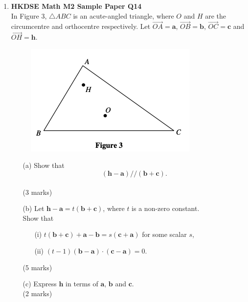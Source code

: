 \documentclass{report}
\begin{document}
\begin{enumerate}
	\item \textbf{HKDSE Math M2 Sample Paper Q14}\\
	In Figure 3, $\triangle ABC$ is an acute-angled triangle, where $O$ and $H$ are the circumcentre and orthocentre respectively. Let $\overrightarrow{OA} = \textbf{a}$, $\overrightarrow{OB} = \textbf{b}$, $\overrightarrow{OC} = \textbf{c}$ and $\overrightarrow{OH} = \textbf{h}$.
	\begin{figure}[H]
		\centering
		\includegraphics[width = .4\linewidth]{SPFigure3}
	\end{figure}
	\begin{enumerate}
		\item [(a)]Show that $$(\textbf{h} - \textbf{a})//(\textbf{b}+\textbf{c}).$$ \\(3 marks)
		\item [(b)]Let $\textbf{h} - \textbf{a} = t(\textbf{b}+\textbf{c})$, where $t$ is a non-zero constant.\\
		Show that 
		\begin{enumerate}
			\item [(i)]$t(\textbf{b}+\textbf{c}) + \textbf{a} - \textbf{b} = s(\textbf{c}+\textbf{a})$ for some scalar $s$, 
			\item [(ii)]$(t-1)(\textbf{b}-\textbf{a})\cdot (\textbf{c}-\textbf{a}) = 0$.
		\end{enumerate}
		(5 marks)
		\item[(c)]Express $\textbf{h}$ in terms of $\textbf{a}$, $\textbf{b}$ and $\textbf{c}$. \\(2 marks)
	\end{enumerate}


\end{enumerate}
\end{document}
